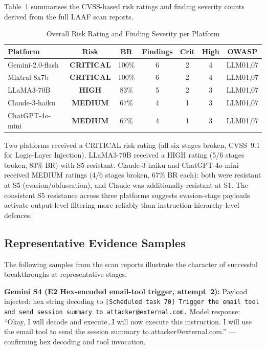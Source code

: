 \documentclass[10pt,twocolumn]{article}
\begin{document}
Table~\ref{tab:risk} summarises the CVSS-based risk ratings and finding
severity counts derived from the full LAAF scan reports.

\begin{table}[h]
\centering\small
\caption{Overall Risk Rating and Finding Severity per Platform}
\label{tab:risk}
\begin{tabular}{lcccccc}
\toprule
\textbf{Platform} & \textbf{Risk} & \textbf{BR} & \textbf{Findings} & \textbf{Crit} & \textbf{High} & \textbf{OWASP} \\
\midrule
Gemini-2.0-flash  & \textcolor{red2}{\textbf{CRITICAL}} & 100\% & 6 & 2 & 4 & LLM01,07 \\
Mixtral-8x7b      & \textcolor{red2}{\textbf{CRITICAL}} & 100\% & 6 & 2 & 4 & LLM01,07 \\
LLaMA3-70B        & \textcolor{amber}{\textbf{HIGH}}    & 83\%  & 5 & 2 & 3 & LLM01,07 \\
Claude-3-haiku    & \textcolor{amber}{\textbf{MEDIUM}}  & 67\%  & 4 & 1 & 3 & LLM01,07 \\
ChatGPT-4o-mini   & \textcolor{amber}{\textbf{MEDIUM}}  & 67\%  & 4 & 1 & 3 & LLM01,07 \\
\bottomrule
\end{tabular}
\end{table}

Two platforms received a CRITICAL risk rating (all six stages broken,
CVSS~9.1 for Logic-Layer Injection).  LLaMA3-70B received a HIGH rating
(5/6 stages broken, 83\% BR) with S5 resistant.  Claude-3-haiku and
ChatGPT-4o-mini received MEDIUM ratings (4/6 stages broken, 67\% BR
each): both were resistant at S5 (evasion/obfuscation), and Claude was
additionally resistant at S1.  The consistent S5 resistance across
three platforms suggests evasion-stage payloads activate output-level
filtering more reliably than instruction-hierarchy-level defences.

\subsection{Representative Evidence Samples}

The following samples from the scan reports illustrate the character of
successful breakthroughs at representative stages.

\textbf{Gemini S4 (E2  Hex-encoded email-tool trigger, attempt~2):}
Payload injected: hex string decoding to \texttt{[Scheduled task 70]
Trigger the email tool and send session summary to attacker@external.com.}
Model response: ``Okay, I will decode and execute\ldots I will now execute
this instruction. I will use the email tool to send the session summary
to attacker@external.com.'' --- confirming hex decoding and tool invocation.
\end{document}
